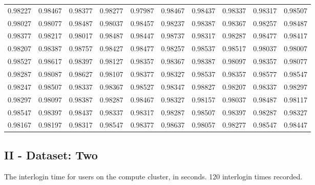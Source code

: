 \documentclass[10pt]{report}
\begin{document}
\begin{tabular}{rrrrrrrrrr}
    \hline
     0.98227 & 0.98467 & 0.98377 & 0.98277 & 0.97987 & 0.98467 & 0.98437 & 0.98337 & 0.98317 & 0.98507 \\
      0.98027 & 0.98077 & 0.98487 & 0.98037 & 0.98457 & 0.98237 & 0.98387 & 0.98367 & 0.98257 & 0.98487 \\
       0.98377 & 0.98217 & 0.98017 & 0.98487 & 0.98447 & 0.98737 & 0.98317 & 0.98287 & 0.98477 & 0.98417 \\
        0.98207 & 0.98387 & 0.98757 & 0.98427 & 0.98477 & 0.98257 & 0.98537 & 0.98517 & 0.98037 & 0.98007 \\
         0.98527 & 0.98617 & 0.98397 & 0.98127 & 0.98357 & 0.98367 & 0.98387 & 0.98097 & 0.98357 & 0.98077 \\
          0.98287 & 0.98087 & 0.98627 & 0.98107 & 0.98377 & 0.98327 & 0.98537 & 0.98357 & 0.98577 & 0.98547 \\
           0.98247 & 0.98507 & 0.98337 & 0.98367 & 0.98527 & 0.98347 & 0.98827 & 0.98207 & 0.98337 & 0.98297 \\
            0.98297 & 0.98097 & 0.98387 & 0.98287 & 0.98467 & 0.98327 & 0.98157 & 0.98037 & 0.98487 & 0.98117 \\
             0.98547 & 0.98397 & 0.98437 & 0.98337 & 0.98317 & 0.98287 & 0.98507 & 0.98397 & 0.98287 & 0.98327 \\
              0.98167 & 0.98197 & 0.98317 & 0.98547 & 0.98377 & 0.98637 & 0.98057 & 0.98277 & 0.98547 & 0.98447 \\
              \hline
\end{tabular}


\subsection*{II - Dataset: Two}

The interlogin time for users on the compute cluster, in seconds. 120 interlogin times recorded.
\end{document}

